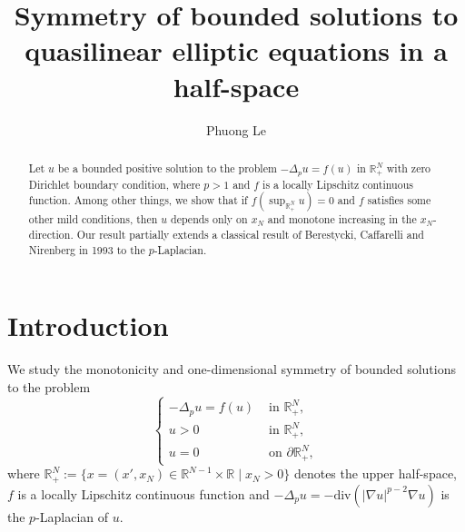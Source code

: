 \documentclass[reqno]{amsart}
\theoremstyle{plain}
\theoremstyle{definition}
\theoremstyle{remark}
\begin{document}
	
	\author{Phuong Le}
	\address{Phuong Le$^{1,2}$ (ORCID: 0000-0003-4724-7118)\newline
		$^1$Faculty of Economic Mathematics, University of Economics and Law, Ho Chi Minh City, Vietnam; \newline
		$^2$Vietnam National University, Ho Chi Minh City, Vietnam}
	
	
	
	
	\title[Symmetry of bounded solutions]{Symmetry of bounded solutions to quasilinear elliptic equations in a half-space}
	\begin{abstract}
		Let $u$ be a bounded positive solution to the problem $-\Delta_p u = f(u)$ in $\mathbb{R}^N_+$ with zero Dirichlet boundary condition, where $p>1$ and $f$ is a locally Lipschitz continuous function. Among other things, we show that if $f(\sup_{\mathbb{R}^N_+} u)=0$ and $f$ satisfies some other mild conditions, then $u$ depends only on $x_N$ and monotone increasing in the $x_N$-direction. Our result partially extends a classical result of Berestycki, Caffarelli and Nirenberg in 1993 to the $p$-Laplacian.
	\end{abstract}
	
	\maketitle
	
	\section{Introduction}
	We study the monotonicity and one-dimensional symmetry of bounded solutions to the problem
	\begin{equation}\label{main}
		\begin{cases}
			-\Delta_p u = f(u) &\text{ in } \mathbb{R}^N_+,\\
			u > 0 &\text{ in } \mathbb{R}^N_+,\\
			u = 0 &\text{ on } \partial\mathbb{R}^N_+,
		\end{cases}
	\end{equation}
	where $\mathbb{R}^N_+ := \{x=(x',x_N)\in\mathbb{R}^{N-1}\times\mathbb{R} \mid x_N>0\}$ denotes the upper half-space, $f$ is a locally Lipschitz continuous function and $-\Delta_p u = -\text{div}(|\nabla u|^{p-2}\nabla u)$ is the $p$-Laplacian of $u$.
	
\end{document}
